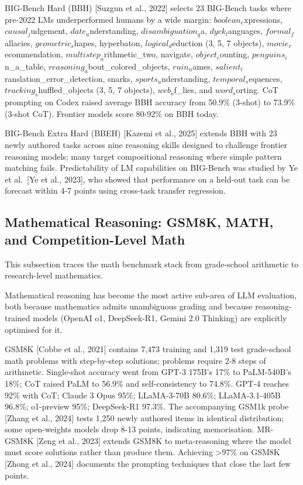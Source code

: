 BIG-Bench Hard (BBH) {[}Suzgun et al., 2022{]} selects 23 BIG-Bench tasks where pre-2022 LMs underperformed humans by a wide margin: \(boolean_e\)xpressions, \(causal_j\)udgement, \(date_u\)nderstanding, \(disambiguation_q\)a, \(dyck_l\)anguages, \(formal_f\)allacies, \(geometric_s\)hapes, hyperbaton, \(logical_d\)eduction (3, 5, 7 objects), \(movie_r\)ecommendation, \(multistep_a\)rithmetic\_two, navigate, \(object_c\)ounting, \(penguins_i\)n\_a\_table, \(reasoning_a\)bout\_colored\_objects, \(ruin_n\)ames, \(salient_t\)ranslation\_error\_detection, snarks, \(sports_u\)nderstanding, \(temporal_s\)equences, \(tracking_s\)huffled\_objects (3, 5, 7 objects), \(web_o\)f\_lies, and \(word_s\)orting. CoT prompting on Codex raised average BBH accuracy from 50.9\% (3-shot) to 73.9\% (3-shot CoT). Frontier models score 80-92\% on BBH today.

BIG-Bench Extra Hard (BBEH) {[}Kazemi et al., 2025{]} extends BBH with 23 newly authored tasks across nine reasoning skills designed to challenge frontier reasoning models; many target compositional reasoning where simple pattern matching fails. Predictability of LM capabilities on BIG-Bench was studied by Ye et al.~{[}Ye et al., 2023{]}, who showed that performance on a held-out task can be forecast within 4-7 points using cross-task transfer regression.

\subsection{Mathematical Reasoning: GSM8K, MATH, and Competition-Level Math}\label{mathematical-reasoning-gsm8k-math-and-competition-level-math}

This subsection traces the math benchmark stack from grade-school arithmetic to research-level mathematics.

Mathematical reasoning has become the most active sub-area of LLM evaluation, both because mathematics admits unambiguous grading and because reasoning-trained models (OpenAI o1, DeepSeek-R1, Gemini 2.0 Thinking) are explicitly optimised for it.

GSM8K {[}Cobbe et al., 2021{]} contains 7,473 training and 1,319 test grade-school math problems with step-by-step solutions; problems require 2-8 steps of arithmetic. Single-shot accuracy went from GPT-3 175B's 17\% to PaLM-540B's 18\%; CoT raised PaLM to 56.9\% and self-consistency to 74.8\%. GPT-4 reaches 92\% with CoT; Claude 3 Opus 95\%; LLaMA-3-70B 80.6\%; LLaMA-3.1-405B 96.8\%; o1-preview 95\%; DeepSeek-R1 97.3\%. The accompanying GSM1k probe {[}Zhang et al., 2024{]} tests 1,250 newly authored items in identical distribution; some open-weights models drop 8-13 points, indicating memorisation. MR-GSM8K {[}Zeng et al., 2023{]} extends GSM8K to meta-reasoning where the model must score solutions rather than produce them. Achieving \textgreater97\% on GSM8K {[}Zhong et al., 2024{]} documents the prompting techniques that close the last few points.

